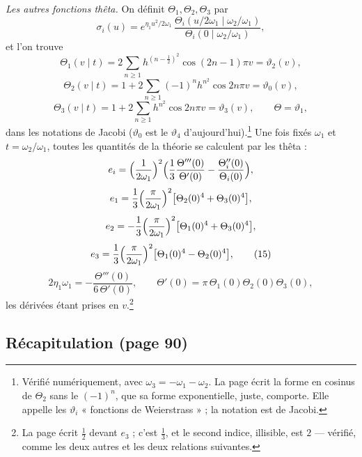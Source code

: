 \documentclass[11pt,a4paper]{article}
\begin{document}
\emph{Les autres fonctions thêta.} On définit $\Theta_1, \Theta_2, \Theta_3$ par
\[
\sigma_i(u) = e^{\eta_1u^2/2\omega_1}\,\frac{\Theta_i(u/2\omega_1 \mid
\omega_2/\omega_1)}{\Theta_i(0 \mid \omega_2/\omega_1)}, \tag{13}
\]
et l'on trouve
\[
\Theta_1(v \mid t) = 2\sum_{n \geqslant 1}h^{(n-\frac12)^2}\cos(2n-1)\pi v =
\vartheta_2(v),
\]
\[
\Theta_2(v \mid t) = 1 + 2\sum_{n \geqslant 1}(-1)^nh^{n^2}\cos 2n\pi v =
\vartheta_0(v),
\]
\[
\Theta_3(v \mid t) = 1 + 2\sum_{n \geqslant 1}h^{n^2}\cos 2n\pi v =
\vartheta_3(v), \qquad \Theta = \vartheta_1 , \tag{14}
\]
dans les notations de Jacobi ($\vartheta_0$ est le $\vartheta_4$
d'aujourd'hui).\footnote{Vérifié numériquement, avec $\omega_3 = -\omega_1 -
\omega_2$. La page écrit la forme en cosinus de $\Theta_2$ sans le
$(-1)^n$, que sa forme exponentielle, juste, comporte. Elle appelle les
$\vartheta_i$ « fonctions de Weierstrass » ; la notation est de Jacobi.} Une
fois fixés $\omega_1$ et $t = \omega_2/\omega_1$, toutes les quantités de la
théorie se calculent par les thêta :
\[
e_i = \Bigl(\frac{1}{2\omega_1}\Bigr)^2\Bigl(\frac13\frac{\Theta'''(0)}{\Theta'(0)} -
\frac{\Theta_i''(0)}{\Theta_i(0)}\Bigr),
\]
\[
e_1 = \frac13\Bigl(\frac{\pi}{2\omega_1}\Bigr)^2\bigl[\Theta_2(0)^4 +
\Theta_3(0)^4\bigr],
\]
\[
e_2 = -\frac13\Bigl(\frac{\pi}{2\omega_1}\Bigr)^2\bigl[\Theta_1(0)^4 +
\Theta_3(0)^4\bigr],
\]
\[
e_3 = \frac13\Bigl(\frac{\pi}{2\omega_1}\Bigr)^2\bigl[\Theta_1(0)^4 -
\Theta_2(0)^4\bigr], \tag{15}
\]
\[
2\eta_1\omega_1 = -\frac{\Theta'''(0)}{6\,\Theta'(0)}, \qquad \Theta'(0) =
\pi\,\Theta_1(0)\Theta_2(0)\Theta_3(0),
\]
les dérivées étant prises en $v$.\footnote{La page écrit $\frac12$ devant $e_3$ ;
c'est $\frac13$, et le second indice, illisible, est $2$ --- vérifié, comme les
deux autres et les deux relations suivantes.}

\subsection*{Récapitulation (page 90)}
\end{document}
